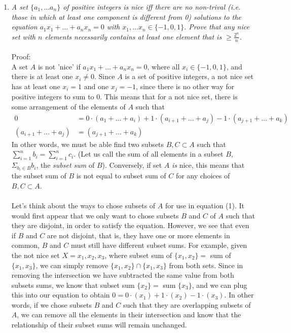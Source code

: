 \documentclass[12pt]{article}
\begin{document}
\begin{enumerate}
\item \emph{A set $\{a_1, \dots a_n\}$ of positive integers is nice iff there are no non-trival (i.e. those in which at least one component is different from 0) solutions to the equation $a_1x_1 + \dots + a_nx_n = 0$ with $x_1, \dots x_n \in \{-1,0,1\}$. Prove that any nice set with $n$ elements necessarily contains at least one element that is $\geq \frac{2^n}{n}$.} \\
\\
Proof: \\
A set $A$ is not 'nice' if $a_1x_1 + \dots + a_nx_n = 0$, where all $x_i \in \{-1,0,1\}$, and there is at least one $x_i \neq 0$. Since $A$ is a set of positive integers, a not nice set has at least one $x_i = 1$ and one $x_j = -1$, since there is no other way for positive integers to sum to 0. This means that for a not nice set, there is some arrangement of the elements of $A$ such that 
\begin{align}
0 &= 0 \cdot(a_1 + \dots + a_i) + 1 \cdot (a_{i+1} + \dots + a_j) -1 \cdot (a_{j+1} + \dots + a_k) \\
\nonumber (a_{i+1} + \dots + a_j) &= (a_{j+1} + \dots + a_k)
\end{align}
In other words, we must be able find two subsets $B, C \subset A$ such that $\sum\limits_{i=1}^{n}b_i = \sum\limits_{i=1}^{n}c_i$. (Let us call the sum of all elements in a subset $B$, $\Sigma_{b_i \in B}b_i$, the \emph{subset sum} of $B$). Conversely, if set $A$ \emph{is} nice, this means that the subset sum of $B$ is not equal to subset sum of $C$ for any choices of $B, C \subset A$. \\
\\
Let's think about the ways to chose subsets of $A$ for use in equation (1). It would first appear that we only want to chose subsets $B$ and $C$ of $A$ such that they are disjoint, in order to satisfy the equation. However, we see that even if $B$ and $C$ are not disjoint, that is, they have one or more elements in common, $B$ and $C$ must still have different subset sums. For example, given the not nice set $X = {x_1, x_2, x_3}$, where subset sum of $\{x_1, x_2\} =$ sum of $\{x_1, x_3\}$, we can simply remove $\{x_1, x_2\} \cap \{x_1, x_3\}$ from both sets. Since in removing the intersection we have subtracted the same value from both subsets sums, we know that subset sum $\{x_2\} =$ sum $\{x_3\}$, and we can plug this into our equation to obtain $0 = 0 \cdot (x_1) + 1 \cdot (x_2) -1 \cdot (x_3)$. In other words, if we chose subsets $B$ and $C$ such that they are overlapping subsets of $A$, we can remove all the elements in their intersection and know that the relationship of their subset sums will remain unchanged.\\

\end{enumerate}
\end{document}
